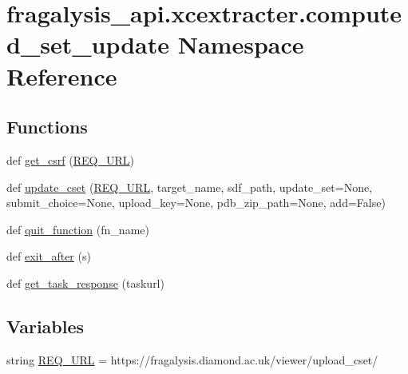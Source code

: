 \hypertarget{namespacefragalysis__api_1_1xcextracter_1_1computed__set__update}{}\section{fragalysis\+\_\+api.\+xcextracter.\+computed\+\_\+set\+\_\+update Namespace Reference}
\label{namespacefragalysis__api_1_1xcextracter_1_1computed__set__update}
\subsection*{Functions}
\begin{DoxyCompactItemize}
\item 
def \hyperlink{namespacefragalysis__api_1_1xcextracter_1_1computed__set__update_a5737d189121121fcfc89d399bf38e877}{get\+\_\+csrf} (\hyperlink{namespacefragalysis__api_1_1xcextracter_1_1computed__set__update_adefba58b79837d4e7133a92963544f3f}{R\+E\+Q\+\_\+\+U\+RL})
\item 
def \hyperlink{namespacefragalysis__api_1_1xcextracter_1_1computed__set__update_a3fd757f4575c325be0c0288fa1f0738d}{update\+\_\+cset} (\hyperlink{namespacefragalysis__api_1_1xcextracter_1_1computed__set__update_adefba58b79837d4e7133a92963544f3f}{R\+E\+Q\+\_\+\+U\+RL}, target\+\_\+name, sdf\+\_\+path, update\+\_\+set=\textquotesingle{}None\textquotesingle{}, submit\+\_\+choice=None, upload\+\_\+key=None, pdb\+\_\+zip\+\_\+path=None, add=False)
\item 
def \hyperlink{namespacefragalysis__api_1_1xcextracter_1_1computed__set__update_a9a7a1666e3c737a48bc3ebfe981adeef}{quit\+\_\+function} (fn\+\_\+name)
\item 
def \hyperlink{namespacefragalysis__api_1_1xcextracter_1_1computed__set__update_ab6ecfd5eeae5a05ee20fa0d19c798f48}{exit\+\_\+after} (s)
\item 
def \hyperlink{namespacefragalysis__api_1_1xcextracter_1_1computed__set__update_a5065036bae4e3eea5df321d366767d29}{get\+\_\+task\+\_\+response} (taskurl)
\end{DoxyCompactItemize}
\subsection*{Variables}
\begin{DoxyCompactItemize}
\item 
string \hyperlink{namespacefragalysis__api_1_1xcextracter_1_1computed__set__update_adefba58b79837d4e7133a92963544f3f}{R\+E\+Q\+\_\+\+U\+RL} = \textquotesingle{}https\+://fragalysis.\+diamond.\+ac.\+uk/viewer/upload\+\_\+cset/\textquotesingle{}
\end{DoxyCompactItemize}


